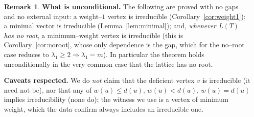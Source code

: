 \documentclass{article}
\theoremstyle{definition}
\newtheorem{remark}{Remark}
\begin{document}
\begin{remark}
\textbf{What is unconditional.}  The following are proved with no gaps and no
external input: a weight--$1$ vertex is irreducible
(Corollary~\ref{cor:weight1}); a minimal vector is irreducible
(Lemma~\ref{lem:minimal}); and, \emph{whenever $L(T)$ has no root}, a
minimum--weight vertex is irreducible (this is Corollary~\ref{cor:noroot}, whose
only dependence is the gap, which for the no--root case reduces to
$\lambda_1\geq2\Rightarrow\lambda_1=m$).  In particular the theorem holds
unconditionally in the very common case that the lattice has no root.

\textbf{Caveats respected.}  We do \emph{not} claim that the deficient vertex
$v$ is irreducible (it need not be), nor that any of $w(u)\leq d(u)$,
$w(u)<d(u)$, $w(u)=d(u)$ implies irreducibility (none do); the witness we use is
a vertex of minimum weight, which the data confirm always includes an
irreducible one.
\end{remark}
\end{document}
